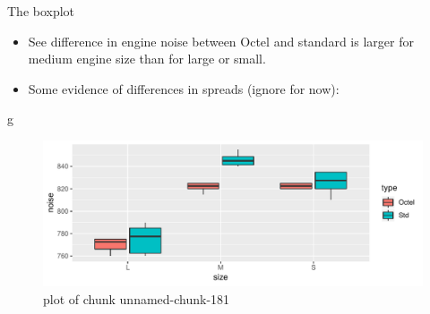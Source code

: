 \documentclass[ignorenonframetext,]{beamer}
\newenvironment{Shaded}{\begin{snugshade}}{\end{snugshade}}
\newcommand{\NormalTok}[1]{#1}
\begin{document}
\begin{frame}[fragile]{The boxplot}
\protect\hypertarget{the-boxplot}{}

\begin{itemize}
\item
  See difference in engine noise between Octel and standard is larger
  for medium engine size than for large or small.
\item
  Some evidence of differences in spreads (ignore for now):
\end{itemize}

\begin{Shaded}
\begin{Highlighting}[]
\NormalTok{g}
\end{Highlighting}
\end{Shaded}

\begin{figure}
\centering
\includegraphics{figure/unnamed-chunk-181-1.pdf}
\caption{plot of chunk unnamed-chunk-181}
\end{figure}

\end{frame}
\end{document}

